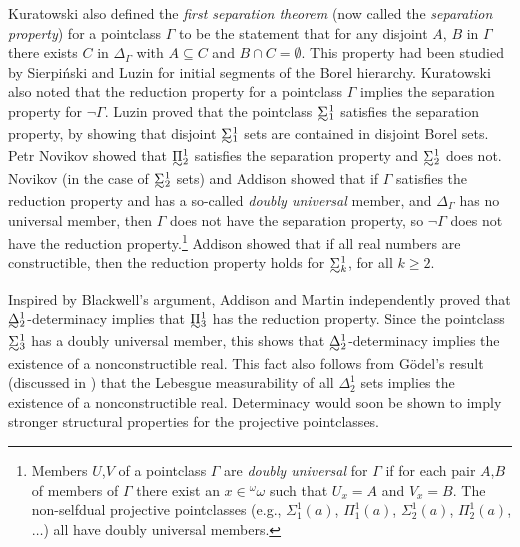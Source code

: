 \documentclass{book}%
\newcommand{\breals}{{^{\omega}}\omega}
\def\underTilde#1{{\baselineskip=0pt\vtop{\hbox{$#1$}\hbox{$\sim$}}}{}}
\newcommand{\uTPi}{\underTilde{\Pi}}
\newcommand{\uTSigma}{\underTilde{\Sigma}}
\newcommand{\uTDelta}{\underTilde{\Delta}}
\begin{document}
Kuratowski also defined the \emph{first separation theorem} (now called the \emph{separation property}) for a pointclass $\Gamma$ to be the statement that for any disjoint $A$, $B$ in $\Gamma$ there exists $C$ in
$\Delta_{\Gamma}$ with $A \subseteq C$ and
$B \cap C = \emptyset$.
This property had been studied by Sierpi\'{n}ski 
and Luzin 
for initial segments of the Borel hierarchy. Kuratowski also noted that the reduction property for a pointclass
$\Gamma$ implies the separation property for $\neg\Gamma$.
Luzin  proved that the pointclass $\uTSigma^{1}_{1}$ satisfies the
separation property, by showing that disjoint $\uTSigma^{1}_{1}$ sets are contained in disjoint Borel sets. Petr Novikov  showed that $\uTPi^{1}_{2}$ satisfies the separation property
and $\uTSigma^{1}_{2}$ does not.  Novikov 
(in the case of $\uTSigma^{1}_{2}$ sets)  and Addison  showed that if
$\Gamma$ satisfies the reduction property and has a so-called \emph{doubly
universal} member, and $\Delta_{\Gamma}$ has no universal member, then $\Gamma$ does not have the
separation property, so $\neg\Gamma$ does not have the reduction
property.\footnote{Members $U$,$V$ of a pointclass $\Gamma$ are \emph{doubly
universal} for $\Gamma$ if for each pair
$A$,$B$ of members of $\Gamma$ there exist an $x \in \breals$ such
that $U_{x} = A$ and $V_{x} = B$.
The non-selfdual projective pointclasses (e.g., $\Sigma^{1}_{1}(a)$,
$\Pi^{1}_{1}(a)$, $\Sigma^{1}_{2}(a)$, $\Pi^{1}_{2}(a)$, $\ldots$)
all have doubly universal members.}
 Addison  showed
that if all real numbers are constructible, then the reduction property holds for $\uTSigma^{1}_{k}$, for all $k \geq 2$.

Inspired by Blackwell's argument, Addison and Martin independently
proved that $\uTDelta^{1}_{2}$-determinacy implies that
$\uTPi^{1}_{3}$ has the reduction property. Since the pointclass $\uTSigma^{1}_{3}$ has a doubly universal
member, this shows that $\uTDelta^{1}_{2}$-determinacy implies the existence of a nonconstructible real. This fact also follows
from G\"{o}del's result (discussed in \cite{Addison:1959}) that the Lebesgue measurability of all $\Delta^{1}_{2}$ sets implies
 the existence of a nonconstructible real. Determinacy would soon
be shown to imply stronger structural properties for the projective
pointclasses.
\end{document}
